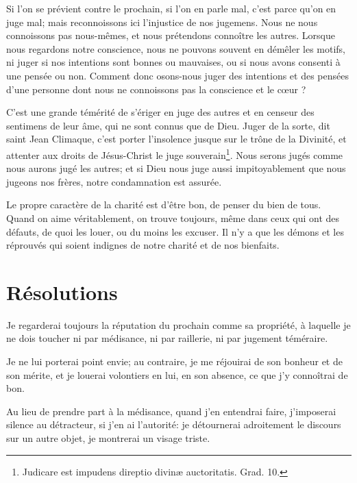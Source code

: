 \documentclass[instructions.tex]{subfiles}
\begin{document}
\tertio Si l’on se prévient contre le prochain, si l’on en parle mal, c’est parce qu’on en juge mal; mais reconnoissons ici l’injustice de nos jugemens. Nous ne nous connoissons pas nous-mêmes, et nous prétendons connoître les autres. Lorsque nous regardons notre conscience, nous ne pouvons souvent en démêler les motifs, ni juger si nos intentions sont bonnes ou mauvaises, ou si nous avons consenti à une pensée ou non. Comment donc osons-nous juger des intentions et des pensées d’une personne dont nous ne connoissons pas la conscience et le cœur ?
 
C’est une grande témérité de s’ériger en juge des autres et en censeur des sentimens de leur âme, qui ne sont connus que de Dieu. Juger de la sorte, dit saint Jean Climaque, c’est porter l’insolence jusque sur le trône de la Divinité, et attenter aux droits de Jésus-Christ le juge souverain\footnote{Judicare est impudens direptio divinæ auctoritatis. Grad. 10.}. Nous serons jugés comme nous aurons jugé les autres; et si Dieu nous juge aussi impitoyablement que nous jugeons nos frères, notre condamnation est assurée.
 
Le propre caractère de la charité est d’être bon, de penser du bien de tous. Quand on aime véritablement, on trouve toujours, même dans ceux qui ont des défauts, de quoi les louer, ou du moins les excuser. Il n’y a que les démons et les réprouvés qui soient indignes de notre charité et de nos bienfaits.
 
\section{Résolutions}
 
\primo Je regarderai toujours la réputation du prochain comme sa propriété, à laquelle je ne dois toucher ni par médisance, ni par raillerie, ni par jugement téméraire. 

\secundo Je ne lui porterai point envie; au contraire, je me réjouirai de son bonheur et de son mérite, et je louerai volontiers en lui, en son absence, ce que j’y connoîtrai de bon. 

\tertio Au lieu de prendre part à la médisance, quand j’en entendrai faire, j’imposerai silence au détracteur, si j’en ai l’autorité: je détournerai adroitement le discours sur un autre objet, je montrerai un visage triste. 

 
\end{document}
